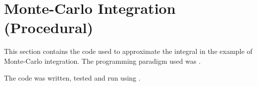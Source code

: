 \chapter{Monte-Carlo Integration (Procedural)}\label{app:code}
%
This section contains the  code used to approximate the integral in the example of Monte-Carlo integration. The programming paradigm used was .

The code was written, tested and run using .



